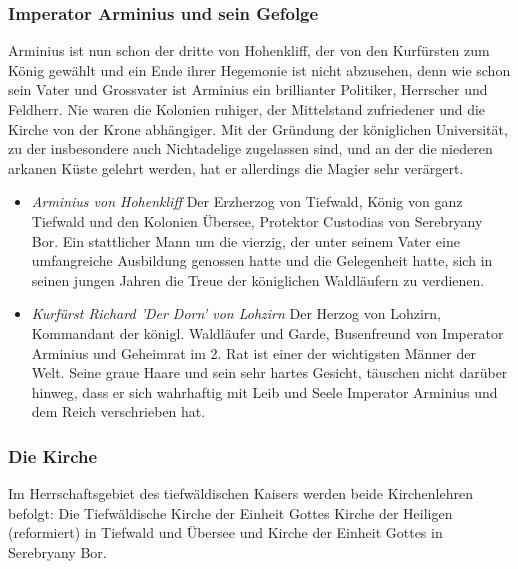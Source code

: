 \documentclass[10pt,twoside,twocolumn,openany]{book}
\begin{document}
\subsubsection{Imperator Arminius und sein Gefolge}
Arminius  ist nun schon der dritte von Hohenkliff, der von den Kurfürsten zum  König gewählt und ein Ende ihrer Hegemonie ist nicht abzusehen, denn wie schon sein Vater und Grossvater ist Arminius ein brillianter Politiker, Herrscher und Feldherr. Nie waren die Kolonien ruhiger, der Mittelstand zufriedener und die Kirche von der Krone abhängiger. Mit der Gründung der königlichen Universität, zu der insbesondere auch Nichtadelige zugelassen sind, und an der die niederen arkanen Küste gelehrt werden, hat er allerdings die Magier sehr verärgert.
\begin{itemize}
	\item\textit{Arminius von Hohenkliff} Der Erzherzog von Tiefwald, König von ganz Tiefwald und den Kolonien Übersee, Protektor Custodias von Serebryany Bor. Ein stattlicher Mann um die vierzig, der unter seinem Vater eine umfangreiche Ausbildung genossen hatte und die Gelegenheit hatte, sich in seinen jungen Jahren die Treue der königlichen Waldläufern zu verdienen.
	\item \textit{Kurfürst Richard 'Der Dorn' von Lohzirn} Der Herzog von Lohzirn, Kommandant der königl. Waldläufer und Garde, Busenfreund von Imperator Arminius und  Geheimrat im 2. Rat ist einer der wichtigsten Männer der Welt. Seine graue Haare und sein sehr hartes Gesicht, täuschen nicht darüber hinweg, dass er sich wahrhaftig mit Leib und Seele Imperator Arminius und dem Reich verschrieben hat.
\end{itemize}

\subsubsection{Die Kirche}

Im Herrschaftsgebiet des tiefwäldischen Kaisers werden beide Kirchenlehren befolgt: Die Tiefwäldische Kirche der Einheit Gottes Kirche der Heiligen (reformiert) in Tiefwald und Übersee und Kirche der Einheit Gottes in Serebryany Bor.
\end{document}
